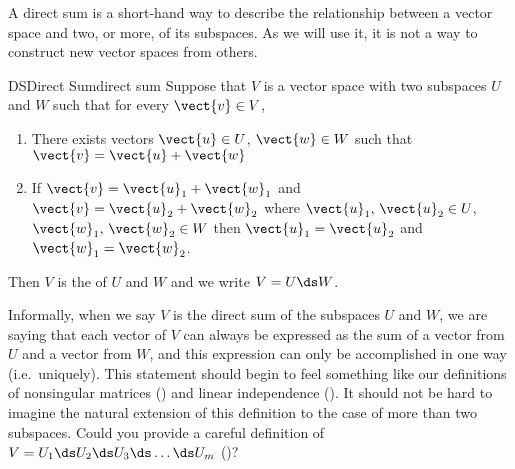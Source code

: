 %
A direct sum is a short-hand way to describe the relationship between a vector space and two, or more, of its subspaces.  As we will use it, it is not a way to construct new vector spaces from others.
%
\begin{definition}{DS}{Direct Sum}{direct sum}
Suppose that $V$ is a vector space with two subspaces $U$ and $W$ such that
for every $\vect{v}\in V$,
\begin{enumerate}
\item  There exists vectors $\vect{u}\in U$, $\vect{w}\in W$ such that $\vect{v}=\vect{u}+\vect{w}$
%
\item If $\vect{v}=\vect{u}_1+\vect{w}_1$ and $\vect{v}=\vect{u}_2+\vect{w}_2$ where $\vect{u}_1,\,\vect{u}_2\in U$, $\vect{w}_1,\,\vect{w}_2\in W$ then $\vect{u}_1=\vect{u}_2$ and $\vect{w}_1=\vect{w}_2$.
\end{enumerate}
Then $V$ is the  of $U$ and $W$ and we write $V=U\ds W$.
\end{definition}
%
Informally, when we say $V$ is the direct sum of the subspaces $U$ and $W$, we are saying that each vector of $V$ can always be expressed as the sum of a vector from $U$ and a vector from $W$, and this expression can only be accomplished in one way (i.e.\ uniquely).  This statement should begin to feel something like our definitions of nonsingular matrices () and linear independence ().   It should not be hard to imagine the natural extension of this definition to the case of more than two subspaces.  Could you provide a careful definition of  $V=U_1\ds U_2\ds U_3\ds \dots\ds U_m$ ()?\par
%
%
